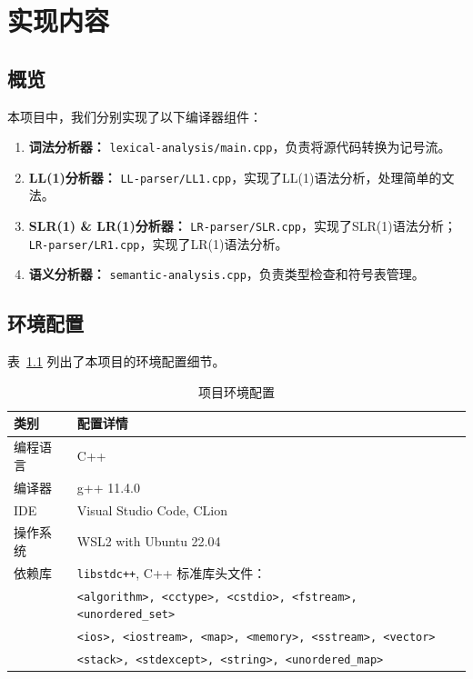 \documentclass[UTF8,openany]{ctexbook}
\begin{document}
\chapter{实现内容}
\label{sec:content}

\section{概览}

本项目中，我们分别实现了以下编译器组件：

\begin{enumerate}[noitemsep,topsep=0pt,partopsep=0pt]
    \item \textbf{词法分析器：} \texttt{lexical-analysis/main.cpp}，负责将源代码转换为记号流。
    \item \textbf{LL(1)分析器：} \texttt{LL-parser/LL1.cpp}，实现了LL(1)语法分析，处理简单的文法。
    \item \textbf{SLR(1) \& LR(1)分析器：} \texttt{LR-parser/SLR.cpp}，实现了SLR(1)语法分析；\texttt{LR-parser/LR1.cpp}，实现了LR(1)语法分析。
    \item \textbf{语义分析器：} \texttt{semantic-analysis.cpp}，负责类型检查和符号表管理。
\end{enumerate}

\section{环境配置}

表~\ref{tab:config} 列出了本项目的环境配置细节。

\begin{table}[H]
    \centering
    \caption{项目环境配置}
    \label{tab:config}
    \begin{tabular}{ll}
    \toprule
    \textbf{类别} & \textbf{配置详情} \\
    \midrule
    编程语言 & C++ \\
    编译器 & g++ 11.4.0 \\
    IDE & Visual Studio Code, CLion \\
    操作系统 & WSL2 with Ubuntu 22.04 \\
    依赖库 & \texttt{libstdc++}, C++ 标准库头文件：\\
           & \texttt{<algorithm>, <cctype>, <cstdio>, <fstream>, <unordered\_set>} \\
           & \texttt{<ios>, <iostream>, <map>, <memory>, <sstream>, <vector>} \\
           & \texttt{<stack>, <stdexcept>, <string>, <unordered\_map>} \\
    \bottomrule
    \end{tabular}
\end{table}
\end{document}

